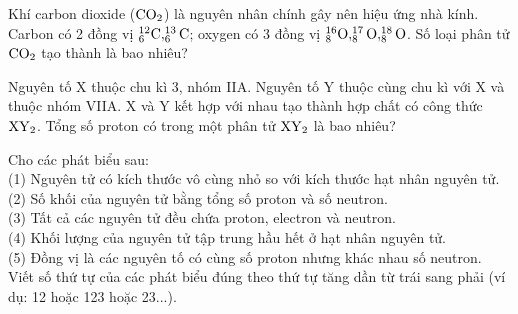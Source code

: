 \documentclass[11pt,a4paper]{article}
\begin{document}
\begin{ex}
Khí carbon dioxide ($\ce{CO2}$) là nguyên nhân chính gây nên hiệu ứng nhà kính. Carbon có 2 đồng vị $^{12}_6\ce{C}, ^{13}_6\ce{C}$; oxygen có 3 đồng vị $^{16}_8\ce{O}, ^{17}_8\ce{O}, ^{18}_8\ce{O}$. Số loại phân tử $\ce{CO2}$ tạo thành là bao nhiêu?

\end{ex}
\begin{ex}
Nguyên tố X thuộc chu kì 3, nhóm IIA. Nguyên tố Y thuộc cùng chu kì với X và thuộc nhóm VIIA. X và Y kết hợp với nhau tạo thành hợp chất có công thức $\ce{XY2}$. Tổng số proton có trong một phân tử $\ce{XY2}$ là bao nhiêu?

\end{ex}
\begin{ex}
Cho các phát biểu sau:\\
(1) Nguyên tử có kích thước vô cùng nhỏ so với kích thước hạt nhân nguyên tử.\\
(2) Số khối của nguyên tử bằng tổng số proton và số neutron.\\
(3) Tất cả các nguyên tử đều chứa proton, electron và neutron.\\
(4) Khối lượng của nguyên tử tập trung hầu hết ở hạt nhân nguyên tử.\\
(5) Đồng vị là các nguyên tố có cùng số proton nhưng khác nhau số neutron.\\
Viết số thứ tự của các phát biểu đúng theo thứ tự tăng dần từ trái sang phải (ví dụ: 12 hoặc 123 hoặc 23...).

\end{ex}
\end{document}
